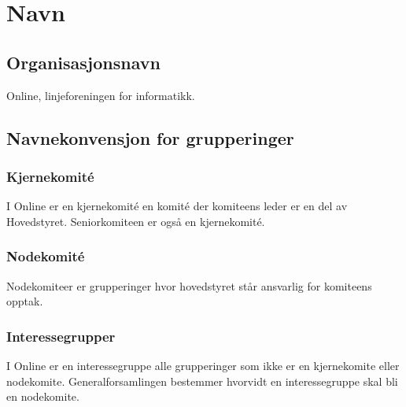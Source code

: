 \chapter{Navn}
\section{Organisasjonsnavn}{
Online, linjeforeningen for informatikk.


}


\section{Navnekonvensjon for grupperinger}


\subsection{Kjernekomité}

I Online er en kjernekomité en komité der komiteens leder er en del av Hovedstyret. Seniorkomiteen er også en kjernekomité. 

\subsection{Nodekomité}

Nodekomiteer er grupperinger hvor hovedstyret står ansvarlig for komiteens opptak.


\subsection{Interessegrupper}

I Online er en interessegruppe alle grupperinger som ikke er en kjernekomite eller nodekomite. Generalforsamlingen bestemmer hvorvidt en interessegruppe skal bli en nodekomite.


